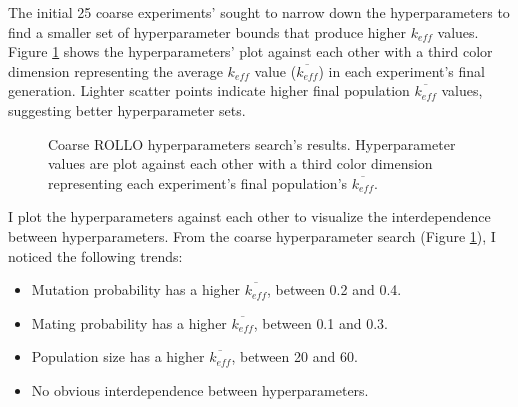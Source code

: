 The initial 25 coarse experiments' sought to narrow down the hyperparameters 
to find a smaller set of hyperparameter bounds that produce higher $k_{eff}$ values.
Figure \ref{fig:hyperparameter_sens} shows the hyperparameters' plot against 
each other with a third color dimension representing the average $k_{eff}$ value
($\overline{k_{eff}}$) in each experiment's final generation. 
Lighter scatter points indicate higher final population $\overline{k_{eff}}$ values, 
suggesting better hyperparameter sets. 
\begin{figure}[htbp]
    \centering
    \caption{Coarse \acrfull{ROLLO} hyperparameters search's results. 
    Hyperparameter values are plot against each other with a third color dimension 
    representing each experiment's final population's $\overline{k_{eff}}$.}
    \label{fig:hyperparameter_sens}
\end{figure}
I plot the hyperparameters against each other to visualize the interdependence 
between hyperparameters. 
From the coarse hyperparameter search (Figure \ref{fig:hyperparameter_sens}), 
I noticed the following trends: 
\begin{itemize}
    \item Mutation probability has a higher $\overline{k_{eff}}$, between 0.2 and 0.4. 
    \item Mating probability has a higher $\overline{k_{eff}}$, between 0.1 and 0.3. 
    \item Population size has a higher $\overline{k_{eff}}$, between 20 and 60. 
    \item No obvious interdependence between hyperparameters. 
\end{itemize} 

